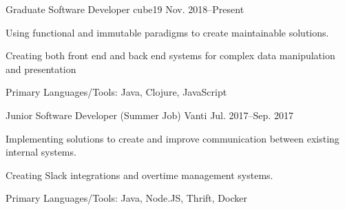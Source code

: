 

\begin{cventries}


  \cventry
    {Graduate Software Developer} %
    {cube19} %
    {} %
    {Nov. 2018--Present} %
    {
      \begin{cvmitems} %
        \item {Using functional and immutable paradigms to create maintainable
          solutions.}
        \item {Creating both front end and back end systems for complex data
          manipulation and presentation}
        \item {Primary Languages/Tools: Java, Clojure, JavaScript}
      \end{cvmitems}
    }


  \cventry
    {Junior Software Developer (Summer Job)} %
    {Vanti} %
    {} %
    {Jul. 2017--Sep. 2017} %
    {
      \begin{cvmitems} %
        \item {Implementing solutions to create and improve communication
          between existing internal systems.}
        \item {Creating Slack integrations and overtime management systems.}
        \item {Primary Languages/Tools: Java, Node.JS, Thrift, Docker}
      \end{cvmitems}
    }



\end{cventries}
